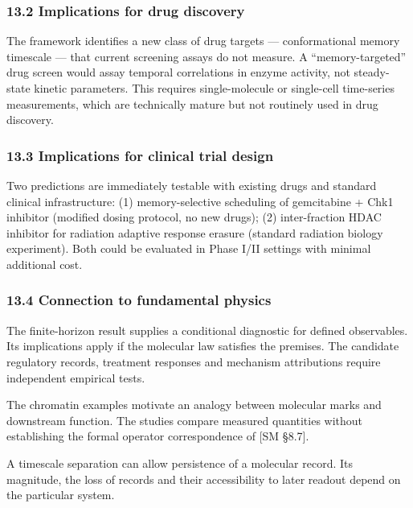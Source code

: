 \documentclass[
]{article}
\begin{document}
\hypertarget{implications-for-drug-discovery}{%
\subsubsection{13.2 Implications for drug
discovery}\label{implications-for-drug-discovery}}

The framework identifies a new class of drug targets --- conformational
memory timescale --- that current screening assays do not measure. A
``memory-targeted'' drug screen would assay temporal correlations in
enzyme activity, not steady-state kinetic parameters. This requires
single-molecule or single-cell time-series measurements, which are
technically mature but not routinely used in drug discovery.

\hypertarget{implications-for-clinical-trial-design}{%
\subsubsection{13.3 Implications for clinical trial
design}\label{implications-for-clinical-trial-design}}

Two predictions are immediately testable with existing drugs and
standard clinical infrastructure: (1) memory-selective scheduling of
gemcitabine + Chk1 inhibitor (modified dosing protocol, no new drugs);
(2) inter-fraction HDAC inhibitor for radiation adaptive response
erasure (standard radiation biology experiment). Both could be evaluated
in Phase I/II settings with minimal additional cost.

\hypertarget{connection-to-fundamental-physics}{%
\subsubsection{13.4 Connection to fundamental
physics}\label{connection-to-fundamental-physics}}

The finite-horizon result supplies a conditional diagnostic for defined
observables. Its implications apply if the molecular law satisfies the
premises. The candidate regulatory records, treatment responses and
mechanism attributions require independent empirical tests.

The chromatin examples motivate an analogy between molecular marks and
downstream function. The studies compare measured quantities without
establishing the formal operator correspondence of {[}SM §8.7{]}.

A timescale separation can allow persistence of a molecular record. Its
magnitude, the loss of records and their accessibility to later readout
depend on the particular system.
\end{document}
